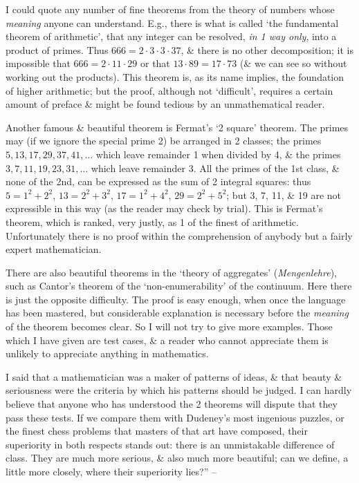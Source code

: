 \documentclass{article}
\numberwithin{equation}{section}
\begin{document}
I could quote any number of fine theorems from the theory of numbers whose \textit{meaning} anyone can understand. E.g., there is what is called `the fundamental theorem of arithmetic', that any integer can be resolved, \textit{in 1 way only}, into a product of primes. Thus $666 = 2\cdot3\cdot3\cdot37$, \& there is no other decomposition; it is impossible that $666 = 2\cdot11\cdot29$ or that $13\cdot89 = 17\cdot73$ (\& we can see so without working out the products). This theorem is, as its name implies, the foundation of higher arithmetic; but the proof, although not `difficult', requires a certain amount of preface \& might be found tedious by an unmathematical reader.

Another famous \& beautiful theorem is Fermat's `2 square' theorem. The primes may (if we ignore the special prime 2) be arranged in 2 classes; the primes $5,13,17,29,37,41,\ldots$ which leave remainder 1 when divided by 4, \& the primes $3,7,11,19,23,31,\ldots$ which leave remainder 3. All the primes of the 1st class, \& none of the 2nd, can be expressed as the sum of 2 integral squares: thus $5 = 1^2 + 2^2$, $13 = 2^2 + 3^2$, $17 = 1^2 + 4^2$, $29 = 2^2 + 5^2$; but 3, 7, 11, \& 19 are not expressible in this way (as the reader may check by trial). This is Fermat's theorem, which is ranked, very justly, as 1 of the finest of arithmetic. Unfortunately there is no proof within the comprehension of anybody but a fairly expert mathematician.

There are also beautiful theorems in the `theory of aggregates' (\textit{Mengenlehre}), such as Cantor's theorem of the `non-enumerability' of the continuum. Here there is just the opposite difficulty. The proof is easy enough, when once the language has been mastered, but considerable explanation is necessary before the \textit{meaning} of the theorem becomes clear. So I will not try to give more examples. Those which I have given are test cases, \& a reader who cannot appreciate them is unlikely to appreciate anything in mathematics.

I said that a mathematician was a maker of patterns of ideas, \& that beauty \& seriousness were the criteria by which his patterns should be judged. I can hardly believe that anyone who has understood the 2 theorems will dispute that they pass these tests. If we compare them with Dudeney's most ingenious puzzles, or the finest chess problems that masters of that art have composed, their superiority in both respects stands out: there is an unmistakable difference of class. They are much more serious, \& also much more beautiful; can we define, a little more closely, where their superiority lies?'' -- \cite[pp. 94--99]{Hardy1992}
\end{document}
